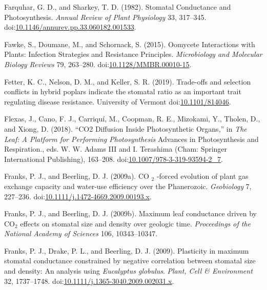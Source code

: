 \documentclass[utf8]{frontiersSCNS}
\begin{document}
\leavevmode\hypertarget{ref-farquhar_stomatal_1982}{}%
Farquhar, G. D., and Sharkey, T. D. (1982). Stomatal Conductance and
Photosynthesis. \emph{Annual Review of Plant Physiology} 33, 317--345.
doi:\href{https://doi.org/10.1146/annurev.pp.33.060182.001533}{10.1146/annurev.pp.33.060182.001533}.

\leavevmode\hypertarget{ref-fawke_oomycete_2015}{}%
Fawke, S., Doumane, M., and Schornack, S. (2015). Oomycete Interactions
with Plants: Infection Strategies and Resistance Principles.
\emph{Microbiology and Molecular Biology Reviews} 79, 263--280.
doi:\href{https://doi.org/10.1128/MMBR.00010-15}{10.1128/MMBR.00010-15}.

\leavevmode\hypertarget{ref-fetter_trade-offs_2019}{}%
Fetter, K. C., Nelson, D. M., and Keller, S. R. (2019). Trade-offs and
selection conflicts in hybrid poplars indicate the stomatal ratio as an
important trait regulating disease resistance. University of Vermont
doi:\href{https://doi.org/10.1101/814046}{10.1101/814046}.

\leavevmode\hypertarget{ref-flexas_co2_2018}{}%
Flexas, J., Cano, F. J., Carriquí, M., Coopman, R. E., Mizokami, Y.,
Tholen, D., and Xiong, D. (2018). ``CO2 Diffusion Inside Photosynthetic
Organs,'' in \emph{The Leaf: A Platform for Performing Photosynthesis}
Advances in Photosynthesis and Respiration., eds. W. W. Adams III and I.
Terashima (Cham: Springer International Publishing), 163--208.
doi:\href{https://doi.org/10.1007/978-3-319-93594-2_7}{10.1007/978-3-319-93594-2\_7}.

\leavevmode\hypertarget{ref-franks_co_2009}{}%
Franks, P. J., and Beerling, D. J. (2009a). CO \(_{\textrm{2}}\) -forced
evolution of plant gas exchange capacity and water-use efficiency over
the Phanerozoic. \emph{Geobiology} 7, 227--236.
doi:\href{https://doi.org/10.1111/j.1472-4669.2009.00193.x}{10.1111/j.1472-4669.2009.00193.x}.

\leavevmode\hypertarget{ref-franks_maximum_2009}{}%
Franks, P. J., and Beerling, D. J. (2009b). Maximum leaf conductance
driven by CO\(_{\textrm{2}}\) effects on stomatal size and density over
geologic time. \emph{Proceedings of the National Academy of Sciences}
106, 10343--10347.

\leavevmode\hypertarget{ref-franks_plasticity_2009}{}%
Franks, P. J., Drake, P. L., and Beerling, D. J. (2009). Plasticity in
maximum stomatal conductance constrained by negative correlation between
stomatal size and density: An analysis using \emph{Eucalyptus globulus}.
\emph{Plant, Cell \& Environment} 32, 1737--1748.
doi:\href{https://doi.org/10.1111/j.1365-3040.2009.002031.x}{10.1111/j.1365-3040.2009.002031.x}.
\end{document}
